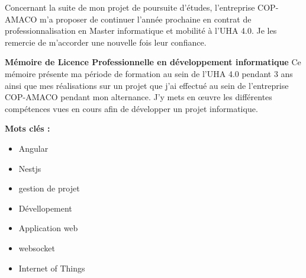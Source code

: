 \documentclass[12pt]{article}
\begin{document}
\justify
\text
Concernant la suite de mon projet de poursuite d'études, l'entreprise COP-AMACO m'a proposer de continuer l'année prochaine en contrat de professionnalisation en Master informatique et mobilité à l'UHA 4.0. Je les remercie de m'accorder une nouvelle fois leur confiance.

\newpage
\centering
\textbf{\large Mémoire de Licence Professionnelle en développement informatique}
\centering
\justify
\text Ce mémoire présente ma période de formation au sein de l'UHA 4.0 pendant 3 ans ainsi que mes réalisations sur un projet que j'ai effectué au sein de l'entreprise COP-AMACO pendant mon alternance. J'y mets en œuvre les différentes compétences vues en cours afin de développer un projet informatique.
\newline

\textbf{Mots clés : }
\newline 

\begin{itemize}
    \item Angular
    \item Nestjs
    \item gestion de projet
    \item Dévellopement
    \item Application web 
    \item websocket
    \item Internet of Things
\end{itemize}
\end{document}
